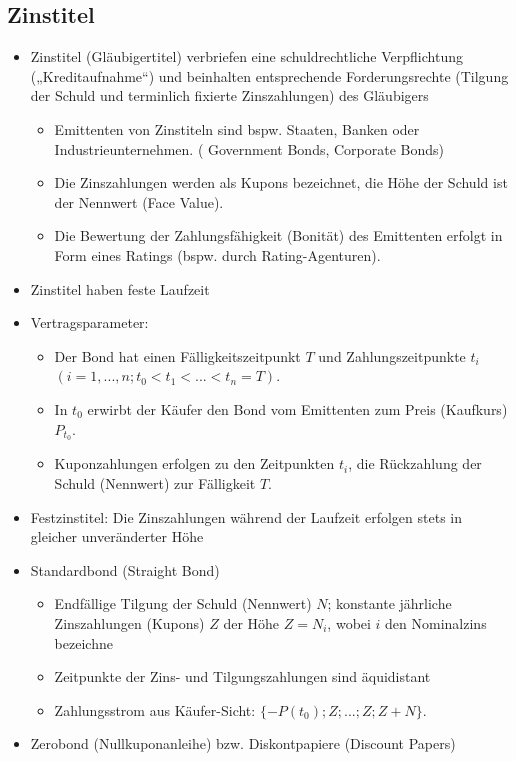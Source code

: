 \documentclass[12pt]{report}
\theoremstyle{dotless}
\theoremstyle{definition}
\begin{document}
\subsection{Zinstitel}
\begin{itemize}
\item Zinstitel (Gläubigertitel) verbriefen eine schuldrechtliche Verpflichtung
(„Kreditaufnahme“) und beinhalten entsprechende Forderungsrechte (Tilgung
der Schuld und terminlich fixierte Zinszahlungen) des Gläubigers
\begin{itemize}
\item Emittenten von Zinstiteln sind bspw. Staaten, Banken oder Industrieunternehmen. ( Government Bonds, Corporate Bonds)
\item Die Zinszahlungen werden als Kupons bezeichnet, die Höhe der Schuld ist der
Nennwert (Face Value).
\item Die Bewertung der Zahlungsfähigkeit (Bonität) des Emittenten erfolgt in Form
eines Ratings (bspw. durch Rating-Agenturen).
\end{itemize}
\item Zinstitel haben feste Laufzeit
\item Vertragsparameter:
\begin{itemize}
\item Der Bond hat einen Fälligkeitszeitpunkt $T$ und Zahlungszeitpunkte $t_i$ $(i = 1,..., n; t_0 < t_1 < ... < t_n = T)$.
\item In $t_0$ erwirbt der Käufer den Bond vom Emittenten zum Preis (Kaufkurs) $P_{t_0}$.
\item Kuponzahlungen erfolgen zu den Zeitpunkten $t_i$, die Rückzahlung der Schuld
(Nennwert) zur Fälligkeit $T$.
\end{itemize}
\item Festzinstitel: Die Zinszahlungen während der Laufzeit erfolgen stets in gleicher unveränderter Höhe
\item Standardbond (Straight Bond)
\begin{itemize}
\item Endfällige Tilgung der Schuld (Nennwert) $N$; konstante jährliche Zinszahlungen
(Kupons) $Z$ der Höhe $Z = N_i$, wobei $i$ den Nominalzins bezeichne
\item Zeitpunkte der Zins- und Tilgungszahlungen sind äquidistant
\item Zahlungsstrom aus Käufer-Sicht: $\{-P(t_0); Z; ... ; Z; Z + N\}$.
\end{itemize}
\item Zerobond (Nullkuponanleihe) bzw. Diskontpapiere (Discount Papers)

\end{itemize}
\end{document}
